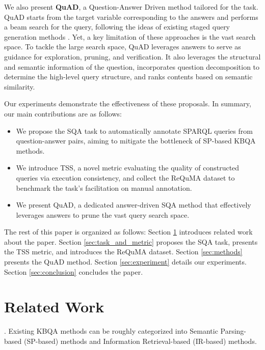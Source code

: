 \documentclass[runningheads]{llncs}
\begin{document}
We also present \textbf{QuAD}, a Question-Answer Driven method tailored for the task.
QuAD starts from the target variable corresponding to the answers and performs a beam search for the query, following the ideas of existing staged query generation methods \cite{bao2016constraint,lan2020qgg,yih2015semantic}.
Yet, a key limitation of these approaches is the vast search space.
To tackle the large search space, QuAD leverages answers to serve as guidance for exploration, pruning, and verification.
It also leverages the structural and semantic information of the question, incorporates question decomposition to determine the high-level query structure, and ranks contents based on semantic similarity.


Our experiments demonstrate the effectiveness of these proposals. In summary, our main contributions are as follows:
\begin{itemize}
    \item We propose the SQA task to automatically annotate SPARQL queries from question-answer pairs, aiming to mitigate the bottleneck of SP-based KBQA methods.
    \item We introduce TSS, a novel metric evaluating the quality of constructed queries via execution consistency, and collect the ReQuMA dataset to benchmark the task's facilitation on manual annotation.
    \item We present QuAD, a dedicated answer-driven SQA method that effectively leverages answers to prune the vast query search space.
\end{itemize} 

The rest of this paper is organized as follows: Section \ref{sec:related_works} introduces related work about the paper. Section \ref{sec:task_and_metric} proposes the SQA task, presents the TSS metric, and introduces the ReQuMA dataset. Section \ref{sec:methods} presents the QuAD method. Section \ref{sec:experiment} details our experiments. Section \ref{sec:conclusion} concludes the paper.

\section{Related Work}\label{sec:related_works}

.
Existing KBQA methods can be roughly categorized into Semantic Parsing-based (SP-based) methods and Information Retrieval-based (IR-based) methods. 
\end{document}
